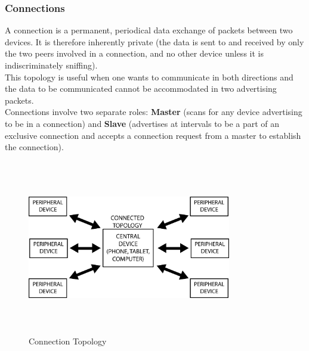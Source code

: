 \subsubsection{Connections}
A connection is a permanent, periodical data exchange of packets between two devices. It is therefore inherently private (the data is sent to and received by only the two peers involved in a connection, and no other device unless it is indiscriminately sniffing).\\
This topology is useful when one wants to communicate in both directions and the data to be communicated cannot be accommodated in two advertising packets.\\
Connections involve two separate roles: \textbf{Master} (scans for any device advertising to be in a connection) and \textbf{Slave} (advertises at intervals to be a part of an exclusive connection and accepts a connection request from a master to establish the connection).
\begin{figure}[ht]
	\centering
	\includegraphics[width=3.5in, height=3in]{images/connected_topology.png}
	\caption{Connection Topology}
\end{figure}
